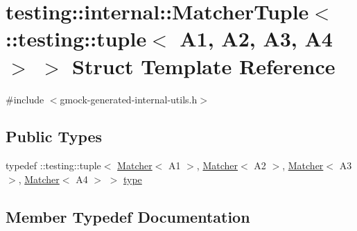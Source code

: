 \hypertarget{structtesting_1_1internal_1_1_matcher_tuple_3_01_1_1testing_1_1tuple_3_01_a1_00_01_a2_00_01_a3_00_01_a4_01_4_01_4}{}\section{testing\+::internal\+::Matcher\+Tuple$<$ \+::testing\+::tuple$<$ A1, A2, A3, A4 $>$ $>$ Struct Template Reference}
\label{structtesting_1_1internal_1_1_matcher_tuple_3_01_1_1testing_1_1tuple_3_01_a1_00_01_a2_00_01_a3_00_01_a4_01_4_01_4}


{\ttfamily \#include $<$gmock-\/generated-\/internal-\/utils.\+h$>$}

\subsection*{Public Types}
\begin{DoxyCompactItemize}
\item 
typedef \+::testing\+::tuple$<$ \mbox{\hyperlink{classtesting_1_1_matcher}{Matcher}}$<$ A1 $>$, \mbox{\hyperlink{classtesting_1_1_matcher}{Matcher}}$<$ A2 $>$, \mbox{\hyperlink{classtesting_1_1_matcher}{Matcher}}$<$ A3 $>$, \mbox{\hyperlink{classtesting_1_1_matcher}{Matcher}}$<$ A4 $>$ $>$ \mbox{\hyperlink{structtesting_1_1internal_1_1_matcher_tuple_3_01_1_1testing_1_1tuple_3_01_a1_00_01_a2_00_01_a3_00_01_a4_01_4_01_4_afa578cadfc6b4725920b115d4f7633df}{type}}
\end{DoxyCompactItemize}


\subsection{Member Typedef Documentation}
\mbox{\label{structtesting_1_1internal_1_1_matcher_tuple_3_01_1_1testing_1_1tuple_3_01_a1_00_01_a2_00_01_a3_00_01_a4_01_4_01_4_afa578cadfc6b4725920b115d4f7633df}} 
